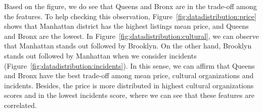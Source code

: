 \documentclass[sigconf]{acmart}
\begin{document}

Based on the figure, we do see that Queens and Bronx are in the trade-off among the features. To help checking this observation, Figure~\ref{fig:datadistribution:price} shows that Manhattan district has the highest listings mean price, and Queens and Bronx are the lowest. In Figure~\ref{fig:datadistribution:cultural}, we can observe that Manhattan stands out followed by Brooklyn. On the other hand, Brooklyn stands out followed by Manhattan when we consider incidents (Figure~\ref{fig:datadistribution:incidents}). In this sense, we can affirm that Queens and Bronx have the best trade-off among mean price, cultural organizations and incidents. Besides, the price is more distributed in highest cultural organizations scores and in the lowest incidents score, where we can see that these features are correlated.

%	
\end{document}
